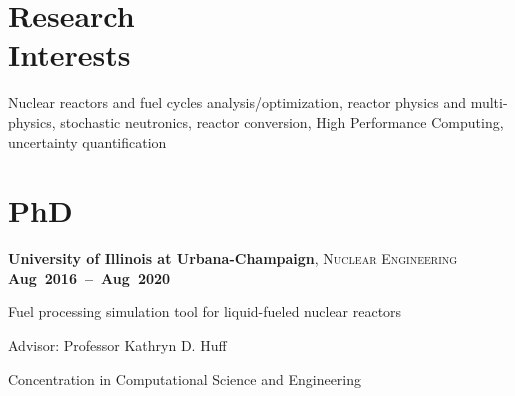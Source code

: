 \documentclass[margin,line]{resume}
\begin{document}
\begin{resume}
    \section{\mysidestyle Research\\Interests}
		Nuclear reactors and fuel cycles analysis/optimization,
		reactor physics and multi-physics, stochastic neutronics, reactor 
		conversion, High Performance Computing, uncertainty quantification
    \section{\mysidestyle PhD}
    \textbf{University of Illinois at Urbana-Champaign}, \textsc{Nuclear 
    Engineering} \hfill\textbf{\mbox{Aug 2016 -- Aug 
    2020}}\vspace{-3mm}\\\vspace{-1mm}%
    \begin{list2}
        \item Fuel processing simulation tool for liquid-fueled nuclear reactors
        \item Advisor:  Professor Kathryn D. Huff
        \item Concentration in Computational Science and Engineering
    \end{list2}\vspace{-1.5mm}

\end{resume}
\end{document}
